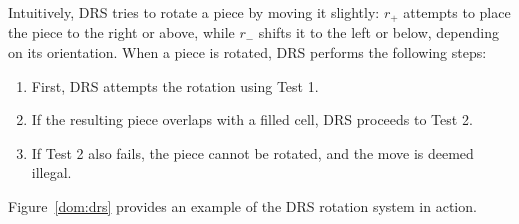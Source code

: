 Intuitively, DRS tries to rotate a piece by moving it slightly: \(r_+\) attempts to place the piece to the right or above, while \(r_-\) shifts it to the left or below, depending on its orientation. When a piece is rotated, DRS performs the following steps:
\begin{enumerate}
    \item First, DRS attempts the rotation using Test 1. 
    \item If the resulting piece overlaps with a filled cell, DRS proceeds to Test 2. 
    \item If Test 2 also fails, the piece cannot be rotated, and the move is deemed illegal.
\end{enumerate}

Figure~\ref{dom:drs} provides an example of the DRS rotation system in action.

